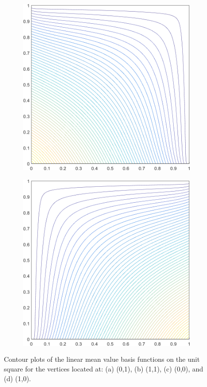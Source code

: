 \begin{figure}
\begin{subfigure}[b]{0.39\textwidth}
		\caption{}
	\end{subfigure}
	\vfill
	\begin{subfigure}[b]{0.39\textwidth}
		\centering
		\includegraphics[width=\textwidth]{figures/sec_BF/square_MV1_contour_b1.png}
		\caption{}
	\end{subfigure}
	\hspace{1.5cm}
	\begin{subfigure}[b]{0.39\textwidth}
		\centering
		\includegraphics[width=\textwidth]{figures/sec_BF/square_MV1_contour_b2.png}
		\caption{}
	\end{subfigure}
\caption{Contour plots of the linear mean value basis functions on the unit square for the vertices located at: (a) (0,1), (b) (1,1), (c) (0,0), and (d) (1,0).}
\end{figure}

